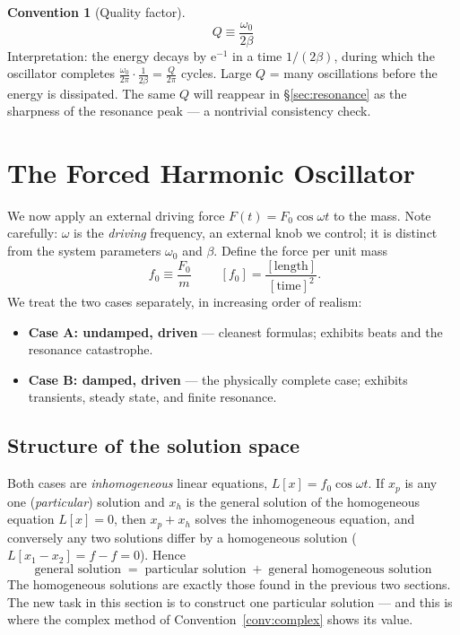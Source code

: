 \documentclass[11pt]{article}
\theoremstyle{plain}
\theoremstyle{definition}
\newtheorem{convention}[lemma]{Convention}
\theoremstyle{remark}
\newcommand{\ee}{\mathrm{e}}
\begin{document}
\begin{convention}[Quality factor]
\begin{equation}
  \boxed{\;Q \equiv \frac{\omega_0}{2\beta}\;}
\end{equation}
Interpretation: the energy decays by $\ee^{-1}$ in a time $1/(2\beta)$,
during which the oscillator completes
$\frac{\omega_0}{2\pi}\cdot\frac{1}{2\beta} = \frac{Q}{2\pi}$
cycles. Large $Q$ = many oscillations before the energy is dissipated. The
same $Q$ will reappear in \S\ref{sec:resonance} as the sharpness of the
resonance peak --- a nontrivial consistency check.
\end{convention}

\section{The Forced Harmonic Oscillator}
\label{sec:forced}

We now apply an external driving force $F(t) = F_0\cos\omega t$ to the mass.
Note carefully: $\omega$ is the \emph{driving} frequency, an external knob we
control; it is distinct from the system parameters $\omega_0$ and $\beta$.
Define the force per unit mass
\begin{equation}
  \boxed{\; f_0 \equiv \frac{F_0}{m} \;}
  \qquad [f_0] = \frac{[\text{length}]}{[\text{time}]^2}.
\end{equation}
We treat the two cases separately, in increasing order of realism:
\begin{itemize}
  \item[\S\ref{sec:forced-undamped}] \textbf{Case A: undamped, driven} ---
  cleanest formulas; exhibits beats and the resonance catastrophe.
  \item[\S\ref{sec:forced-damped}] \textbf{Case B: damped, driven} --- the
  physically complete case; exhibits transients, steady state, and finite
  resonance.
\end{itemize}

\subsection*{Structure of the solution space}
Both cases are \emph{inhomogeneous} linear equations, $L[x] = f_0\cos\omega t$.
If $x_p$ is any one (\emph{particular}) solution and $x_h$ is the general
solution of the homogeneous equation $L[x]=0$, then $x_p + x_h$ solves the
inhomogeneous equation, and conversely any two solutions differ by a
homogeneous solution ($L[x_1-x_2] = f - f = 0$). Hence
\begin{equation}
  \boxed{\;\text{general solution} \;=\; \text{particular solution}
  \;+\; \text{general homogeneous solution}\;}
  \label{eq:structure}
\end{equation}
The homogeneous solutions are exactly those found in the previous two
sections. The new task in this section is to construct one particular
solution --- and this is where the complex method of
Convention~\ref{conv:complex} shows its value.
\end{document}
